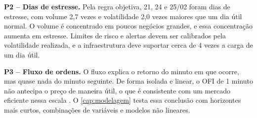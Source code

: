 \textbf{P2 -- Dias de estresse.} Pela regra objetiva, 21, 24 e 25/02 foram dias de
estresse, com volume 2,7 vezes e volatilidade 2,0 vezes maiores que um dia útil
normal. O volume é concentrado em poucos negócios grandes, e essa concentração
aumenta em estresse. Limites de risco e alertas devem ser calibrados pela
volatilidade realizada, e a infraestrutura deve suportar cerca de 4 vezes a carga
de um dia útil.

\textbf{P3 -- Fluxo de ordens.} O fluxo explica o retorno do minuto em que ocorre,
mas quase nada do minuto seguinte. De forma isolada e linear, o OFI de 1 minuto
não antecipa o preço de maneira útil, o que é consistente com um mercado
eficiente nessa escala \cite{fama1970}. O \autoref{cap:modelagem} testa essa
conclusão com horizontes mais curtos, combinações de variáveis e modelos não
lineares.
